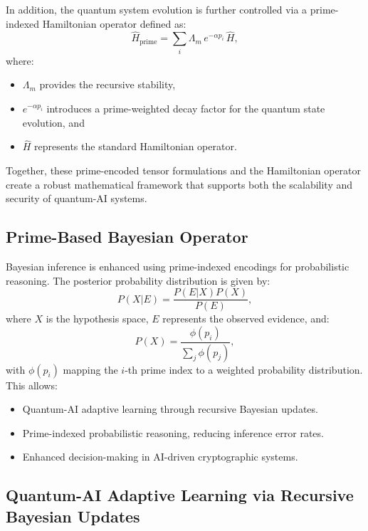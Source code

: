 \documentclass{article}
\theoremstyle{plain}
\begin{document}
In addition, the quantum system evolution is further controlled via a prime-indexed Hamiltonian operator defined as:
\begin{equation}
\hat{H}_{\text{prime}} = \sum_{i} \Lambda_m \, e^{-\alpha p_i} \, \hat{H},
\end{equation}
where:
\begin{itemize}
    \item \(\Lambda_m\) provides the recursive stability,
    \item \(e^{-\alpha p_i}\) introduces a prime-weighted decay factor for the quantum state evolution, and
    \item \(\hat{H}\) represents the standard Hamiltonian operator.
\end{itemize}

Together, these prime-encoded tensor formulations and the Hamiltonian operator create a robust mathematical framework that supports both the scalability and security of quantum-AI systems.

\subsection{Prime-Based Bayesian Operator}

Bayesian inference is enhanced using prime-indexed encodings for probabilistic reasoning. The posterior probability distribution is given by:
\begin{equation}
P(X | E) = \frac{P(E | X) P(X)}{P(E)},
\end{equation}
where $X$ is the hypothesis space, $E$ represents the observed evidence, and:
\begin{equation}
P(X) = \frac{\phi(p_i)}{\sum_{j} \phi(p_j)},
\end{equation}
with $\phi(p_i)$ mapping the $i$-th prime index to a weighted probability distribution. This allows:
\begin{itemize}
    \item Quantum-AI adaptive learning through recursive Bayesian updates.
    \item Prime-indexed probabilistic reasoning, reducing inference error rates.
    \item Enhanced decision-making in AI-driven cryptographic systems.
\end{itemize}

\subsection{Quantum-AI Adaptive Learning via Recursive Bayesian Updates}
\end{document}
